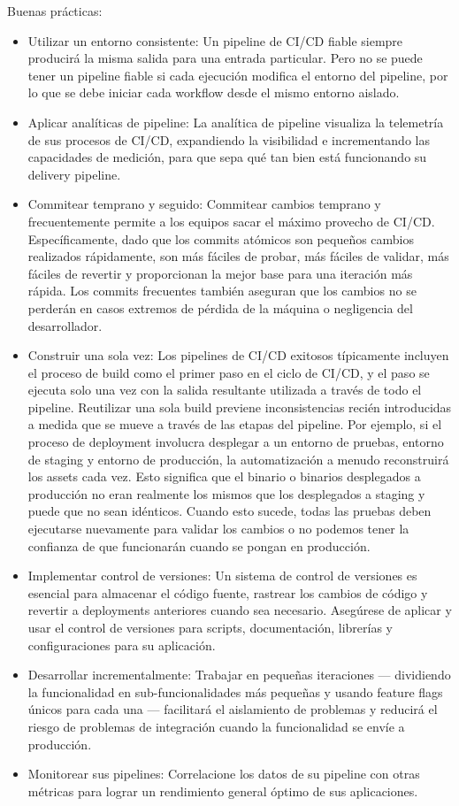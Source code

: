 \documentclass[12pt]{book}
\begin{document}
Buenas prácticas:
\begin{itemize}
    \item Utilizar un entorno consistente: Un pipeline de CI/CD fiable siempre producirá la misma salida para una entrada particular. Pero no se puede tener un pipeline fiable si cada ejecución modifica el entorno del pipeline, por lo que se debe iniciar cada workflow desde el mismo entorno aislado.
    \item Aplicar analíticas de pipeline: La analítica de pipeline visualiza la telemetría de sus procesos de CI/CD, expandiendo la visibilidad e incrementando las capacidades de medición, para que sepa qué tan bien está funcionando su delivery pipeline.
    \item Commitear temprano y seguido: Commitear cambios temprano y frecuentemente permite a los equipos sacar el máximo provecho de CI/CD. Específicamente, dado que los commits atómicos son pequeños cambios realizados rápidamente, son más fáciles de probar, más fáciles de validar, más fáciles de revertir y proporcionan la mejor base para una iteración más rápida. Los commits frecuentes también aseguran que los cambios no se perderán en casos extremos de pérdida de la máquina o negligencia del desarrollador.
    \item Construir una sola vez: Los pipelines de CI/CD exitosos típicamente incluyen el proceso de build como el primer paso en el ciclo de CI/CD, y el paso se ejecuta solo una vez con la salida resultante utilizada a través de todo el pipeline. Reutilizar una sola build previene inconsistencias recién introducidas a medida que se mueve a través de las etapas del pipeline.
    Por ejemplo, si el proceso de deployment involucra desplegar a un entorno de pruebas, entorno de staging y entorno de producción, la automatización a menudo reconstruirá los assets cada vez. Esto significa que el binario o binarios desplegados a producción no eran realmente los mismos que los desplegados a staging y puede que no sean idénticos. Cuando esto sucede, todas las pruebas deben ejecutarse nuevamente para validar los cambios o no podemos tener la confianza de que funcionarán cuando se pongan en producción.
    \item Implementar control de versiones: Un sistema de control de versiones es esencial para almacenar el código fuente, rastrear los cambios de código y revertir a deployments anteriores cuando sea necesario. Asegúrese de aplicar y usar el control de versiones para scripts, documentación, librerías y configuraciones para su aplicación.
    \item Desarrollar incrementalmente: Trabajar en pequeñas iteraciones — dividiendo la funcionalidad en sub-funcionalidades más pequeñas y usando feature flags únicos para cada una — facilitará el aislamiento de problemas y reducirá el riesgo de problemas de integración cuando la funcionalidad se envíe a producción.
    \item Monitorear sus pipelines: Correlacione los datos de su pipeline con otras métricas para lograr un rendimiento general óptimo de sus aplicaciones.
\end{itemize}
\end{document}
